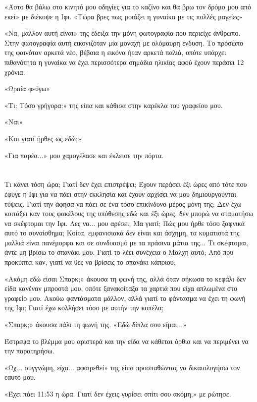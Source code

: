\documentclass[12pt,twoside, openany]{book}
\begin{document}
«Άστο θα βάλω στο κινητό μου οδηγίες για το καζίνο και θα βρω τον δρόμο μου από εκεί» με διέκοψε η Ιφι. «Τώρα βρες πως μοιάζει η γυναίκα με τις πολλές μαγείες»

«Να, μάλλον αυτή είναι» της έδειξα την μόνη φωτογραφία που περιείχε άνθρωπο. Στην φωτογραφία αυτή εικονιζόταν μία μοναχή με ολόμαυρη ένδυση. Το πρόσωπο της φαινόταν αρκετά νέο, βέβαια η εικόνα ήταν αρκετά παλιά, οπότε υπάρχει πιθανότητα η γυναίκα να έχει περισσότερα σημάδια ηλικίας αφού έχουν περάσει 12 χρόνια.

«Ωραία φεύγω»

«Τι; Τόσο γρήγορα;» της είπα και κάθισα στην καρέκλα του γραφείου μου.

«Ναι»

«Και γιατί ήρθες ως εδώ;»

«Για παρέα...» μου χαμογέλασε και έκλεισε την πόρτα.

\chapter{}

Τι κάνει τόση ώρα; Γιατί δεν έχει επιστρέψει; Έχουν περάσει έξι ώρες από τότε που έφυγε η Ιφι για να πάει στην εκκλησία και έχουν αρχίσει να μου δημιουργούνται τύψεις. Γιατί την άφησα να πάει σε ένα τόσο επικίνδυνο μέρος μόνη της; Δεν έχω κοιτάξει καν τους φακέλους της υπόθεσης εδώ και έξι ώρες, δεν μπορώ να σταματήσω να σκέφτομαι την Ιφι. Λες να... μου αρέσει; Μα γιατί; Πώς μου ήρθε τόσο ξαφνικά αυτό το συναίσθημα; Κοίτα, εμφανισιακά δεν είναι και άσχημη, τα κυματιστά της μαλλιά είναι πανέμορφα και σε συνδυασμό με τα πράσινα μάτια της... Τι σκέφτομαι, άντε μη βρίσω το σπανάκι μου. Γιατί το λέει συνέχεια ο Μαλχη αυτό; Από που προκύπτει καν, γιατί να θες να βρίσεις το σπανάκι κάποιου; 

«Ακόμη εδώ είσαι Σπαρκ;» άκουσα τη φωνή της, αλλά όταν σήκωσα το κεφάλι δεν είδα κανέναν μπροστά μου, οπότε ξανακοίταξα τα χαρτιά που είχα απλωμένα στο γραφείο μου. Ακούω φαντάσματα μάλλον, αλλά γιατί το φάντασμα να έχει τη φωνή της Ιφι; Γιατί έχω κολλήσει τόσο με αυτήν την κοπέλα;

«Σπαρκ;» άκουσα πάλι τη φωνή της. «Εδώ δίπλα σου είμαι...»

Έστρεψα το βλέμμα μου αριστερά και την είδα να κάθεται όρθια και να περιμένει να την παρατηρήσω.

«Ωχ... συγγνώμη, είχα... αφαιρεθεί» της είπα προσπαθώντας να δικαιολογήσω τον εαυτό μου.

«Έχει πάει 11:53 η ώρα. Γιατί δεν έχεις γυρίσει σπίτι σου ακόμη;» με ρώτησε.
\end{document}
